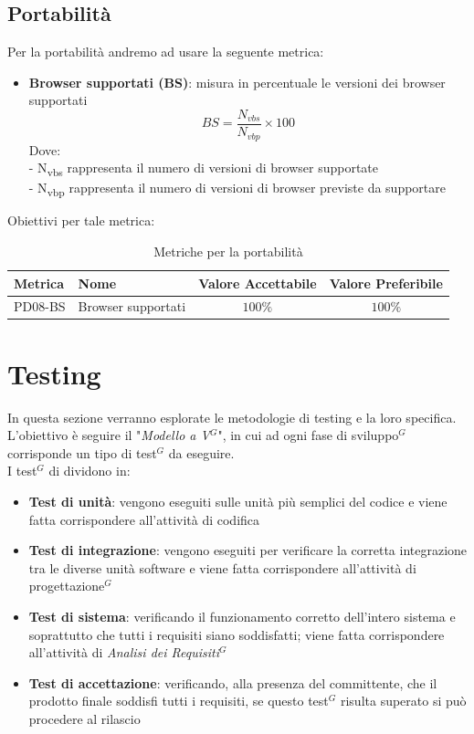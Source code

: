 \documentclass[a4paper,10pt]{article}
\begin{document}
\subsection{Portabilità}
Per la portabilità andremo ad usare la seguente metrica:
\begin{itemize}
    \item \textbf{Browser supportati (BS)}: misura in percentuale le versioni dei browser supportati
    \[ 
        BS = \frac{N_{vbs}}{N_{vbp}} \times 100
    \]
    Dove: \\
    - N\textsubscript{vbs} rappresenta il numero di versioni di browser supportate \\
    - N\textsubscript{vbp} rappresenta il numero di versioni di browser previste da supportare
\end{itemize}
Obiettivi per tale metrica:
\begin{table}[H]
\centering
\renewcommand{\arraystretch}{1.2}
\begin{tabular}{|l|l|c|c|}
\hline
\textbf{Metrica} & \textbf{Nome} & \textbf{Valore Accettabile} & \textbf{Valore Preferibile} \\
\hline
PD08-BS & Browser supportati & $100\%$ & $100\%$ \\
\hline
\end{tabular}
\caption{Metriche per la portabilità}
\label{tab:metriche-portabilità}
\end{table}

\section{Testing}
In questa sezione verranno esplorate le metodologie di testing e la loro specifica. L'obiettivo è seguire il "\textit{Modello a V$^G$}", in cui ad ogni fase di sviluppo$^G$ corrisponde un tipo di test$^G$ da eseguire.\\
I test$^G$ di dividono in:
\begin{itemize}
    \item \textbf{Test di unità}: vengono eseguiti sulle unità più semplici del codice e viene fatta corrispondere all'attività di codifica
    \item \textbf{Test di integrazione}: vengono eseguiti per verificare la corretta integrazione tra le diverse unità software e viene fatta corrispondere all'attività di progettazione$^G$
    \item \textbf{Test di sistema}: verificando il funzionamento corretto dell'intero sistema e soprattutto che tutti i requisiti siano soddisfatti; viene fatta corrispondere all'attività di \textit{Analisi dei Requisiti$^G$}
    \item \textbf{Test di accettazione}: verificando, alla presenza del committente, che il prodotto finale soddisfi tutti i requisiti, se questo test$^G$ risulta superato si può procedere al rilascio
\end{itemize}
\end{document}
